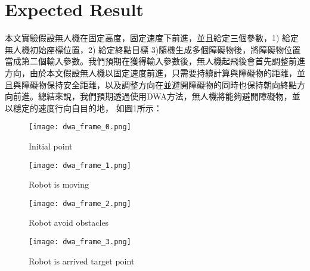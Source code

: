 \documentclass[crop=false]{standalone}
\begin{document}
	\section{Expected Result}
	本文實驗假設無人機在固定高度，固定速度下前進，並且給定三個參數，1) 給定無人機初始座標位置，2) 給定終點目標 3)隨機生成多個障礙物後，將障礙物位置當成第二個輸入參數。我們預期在獲得輸入參數後，無人機起飛後會首先調整前進方向，由於本文假設無人機以固定速度前進，只需要持續計算與障礙物的距離，並且與障礙物保持安全距離，以及調整方向在並避開障礙物的同時也保持朝向終點方向前進。總結來說，我們預期透過使用DWA方法，無人機將能夠避開障礙物，並以穩定的速度行向自目的地， 如圖1所示：
    
    \begin{figure}[htbp]	
    	\centering
    	\begin{minipage}{0.49\linewidth}
    		\centering
    		\texttt{[image: dwa\_frame\_0.png]}
    		\caption{Initial point}
    		\label{Initial robot point}%
    	\end{minipage}
    	\begin{minipage}{0.49\linewidth}
    		\centering
    		\texttt{[image: dwa\_frame\_1.png]}
    		\caption{Robot is moving}
    		\label{Moving robot}%
    	\end{minipage}
    	
    	\begin{minipage}{0.49\linewidth}
    		\centering
    		\texttt{[image: dwa\_frame\_2.png]}
    		\caption{Robot avoid obstacles}
    		\label{Robot avoid obstacles}%
    	\end{minipage}
    	\begin{minipage}{0.49\linewidth}
    		\centering
    		\texttt{[image: dwa\_frame\_3.png]}
    		\caption{Robot is arrived target point}
    		\label{Robot is arrived target point}%
    	\end{minipage}
    \end{figure}
\end{document}
